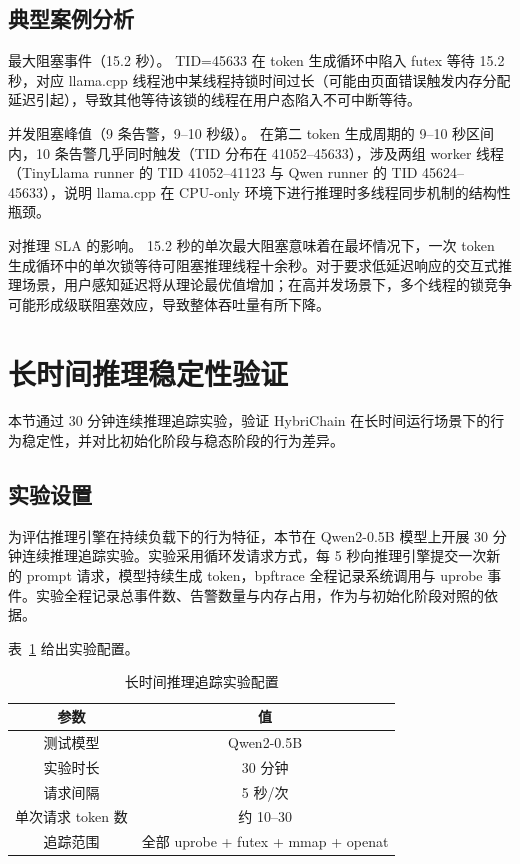 \subsection{典型案例分析}

最大阻塞事件（15.2 秒）。 TID=45633 在 token 生成循环中陷入 futex 等待 15.2 秒，对应 llama.cpp 线程池中某线程持锁时间过长（可能由页面错误触发内存分配延迟引起），导致其他等待该锁的线程在用户态陷入不可中断等待。

并发阻塞峰值（9 条告警，9–10 秒级）。 在第二 token 生成周期的 9–10 秒区间内，10 条告警几乎同时触发（TID 分布在 41052–45633），涉及两组 worker 线程（TinyLlama runner 的 TID 41052–41123 与 Qwen runner 的 TID 45624–45633），说明 llama.cpp 在 CPU-only 环境下进行推理时多线程同步机制的结构性瓶颈。

对推理 SLA 的影响。 15.2 秒的单次最大阻塞意味着在最坏情况下，一次 token 生成循环中的单次锁等待可阻塞推理线程十余秒。对于要求低延迟响应的交互式推理场景，用户感知延迟将从理论最优值增加；在高并发场景下，多个线程的锁竞争可能形成级联阻塞效应，导致整体吞吐量有所下降。

\section{长时间推理稳定性验证}

本节通过 30 分钟连续推理追踪实验，验证 HybriChain 在长时间运行场景下的行为稳定性，并对比初始化阶段与稳态阶段的行为差异。

\subsection{实验设置}

为评估推理引擎在持续负载下的行为特征，本节在 Qwen2-0.5B 模型上开展 30 分钟连续推理追踪实验。实验采用循环发请求方式，每 5 秒向推理引擎提交一次新的 prompt 请求，模型持续生成 token，bpftrace 全程记录系统调用与 uprobe 事件。实验全程记录总事件数、告警数量与内存占用，作为与初始化阶段对照的依据。

表~\ref{tab:long_run_config} 给出实验配置。

\begin{table}[H]
    \centering
    \caption{长时间推理追踪实验配置}
    \label{tab:long_run_config}
    \begin{tabular}{|c|c|}
        \hline
        \textbf{参数} & \textbf{值} \\
        \hline
        测试模型 & Qwen2-0.5B \\
        \hline
        实验时长 & 30 分钟 \\
        \hline
        请求间隔 & 5 秒/次 \\
        \hline
        单次请求 token 数 & 约 10–30 \\
        \hline
        追踪范围 & 全部 uprobe + futex + mmap + openat \\
        \hline
    \end{tabular}
\end{table}

